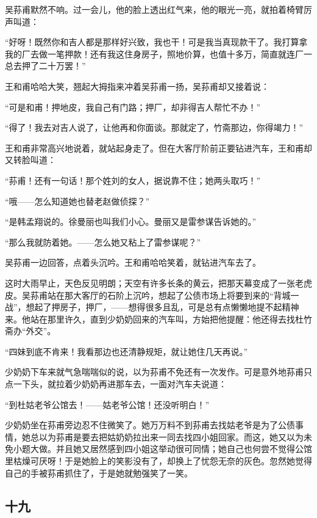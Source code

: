 \par 吴荪甫默然不响。过一会儿，他的脸上透出红气来，他的眼光一亮，就拍着椅臂厉声叫道：
\par “好呀！既然你和吉人都是那样好兴致，我也干！可是我当真现款干了。我打算拿我的厂去做一笔押款！还有我这住身房子，照地价算，也值十多万，简直就连厂一总去押了二十万罢！”
\par 王和甫哈哈大笑，翘起大拇指来冲着吴荪甫一扬，吴荪甫却又接着说：
\par “可是和甫！押地皮，我自己有门路；押厂，却非得吉人帮忙不办！”
\par “得了！我去对吉人说了，让他再和你面谈。那就定了，竹斋那边，你得竭力！”
\par 王和甫非常高兴地说着，就站起身走了。但在大客厅阶前正要钻进汽车，王和甫却又转脸叫道：
\par “荪甫！还有一句话！那个姓刘的女人，据说靠不住；她两头取巧！”
\par “哦——怎么知道她也替老赵做侦探？”
\par “是韩孟翔说的。徐曼丽也叫我们小心。曼丽又是雷参谋告诉她的。”
\par “那么我就防着她。——怎么她又粘上了雷参谋呢？”
\par 吴荪甫一边回答，点着头沉吟。王和甫哈哈笑着，就钻进汽车去了。
\par 这时大雨早止，天色反见明朗；天空有许多长条的黄云，把那天幕变成了一张老虎皮。吴荪甫站在那大客厅的石阶上沉吟，想起了公债市场上将要到来的“背城一战”，想起了押房子，押厂，——想得很多且乱，可是总有点懒懒地提不起精神来。他站在那里许久，直到少奶奶回来的汽车叫，方始把他提醒：他还得去找杜竹斋办“外交”。
\par “四妹到底不肯来！我看那边也还清静规矩，就让她住几天再说。”
\par 少奶奶下车来就气急喘喘似的说，以为荪甫不免还有一次发作。可是意外地荪甫只点一下头，就拉着少奶奶再进那车去，一面对汽车夫说道：
\par “到杜姑老爷公馆去！——姑老爷公馆！还没听明白！”
\par 少奶奶坐在荪甫旁边忍不住微笑了。她万万料不到荪甫去找姑老爷是为了公债事情，她总以为荪甫是要去把姑奶奶拉出来一同去找四小姐回家。而这，她又以为未免小题大做。并且她又居然感到四小姐这举动很可同情；她自己也何尝不觉得公馆里枯燥可厌呀！于是她脸上的笑影没有了，却换上了忧怨无奈的灰色。忽然她觉得自己的手被荪甫抓住了，于是她就勉强笑了一笑。


\subsection*{十九}


